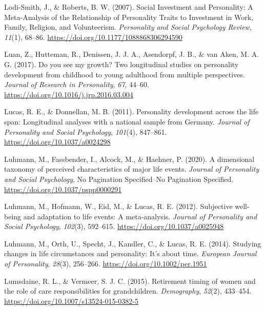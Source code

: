 \documentclass[
  english,
  man, noextraspace]{apa7}
\begin{document}
\leavevmode\hypertarget{ref-lodi-smithSocialInvestmentPersonality2007}{}%
Lodi-Smith, J., \& Roberts, B. W. (2007). Social Investment and Personality: A Meta-Analysis of the Relationship of Personality Traits to Investment in Work, Family, Religion, and Volunteerism. \emph{Personality and Social Psychology Review}, \emph{11}(1), 68--86. \url{https://doi.org/10.1177/1088868306294590}

\leavevmode\hypertarget{ref-luanYouSeeMy2017}{}%
Luan, Z., Hutteman, R., Denissen, J. J. A., Asendorpf, J. B., \& van Aken, M. A. G. (2017). Do you see my growth? Two longitudinal studies on personality development from childhood to young adulthood from multiple perspectives. \emph{Journal of Research in Personality}, \emph{67}, 44--60. \url{https://doi.org/10.1016/j.jrp.2016.03.004}

\leavevmode\hypertarget{ref-lucasPersonalityDevelopmentLife2011}{}%
Lucas, R. E., \& Donnellan, M. B. (2011). Personality development across the life span: Longitudinal analyses with a national sample from Germany. \emph{Journal of Personality and Social Psychology}, \emph{101}(4), 847--861. \url{https://doi.org/10.1037/a0024298}

\leavevmode\hypertarget{ref-luhmannDimensionalTaxonomyPerceived2020}{}%
Luhmann, M., Fassbender, I., Alcock, M., \& Haehner, P. (2020). A dimensional taxonomy of perceived characteristics of major life events. \emph{Journal of Personality and Social Psychology}, No Pagination Specified--No Pagination Specified. \url{https://doi.org/10.1037/pspp0000291}

\leavevmode\hypertarget{ref-luhmannSubjectiveWellbeingAdaptation2012}{}%
Luhmann, M., Hofmann, W., Eid, M., \& Lucas, R. E. (2012). Subjective well-being and adaptation to life events: A meta-analysis. \emph{Journal of Personality and Social Psychology}, \emph{102}(3), 592--615. \url{https://doi.org/10.1037/a0025948}

\leavevmode\hypertarget{ref-luhmannStudyingChangesLife2014}{}%
Luhmann, M., Orth, U., Specht, J., Kandler, C., \& Lucas, R. E. (2014). Studying changes in life circumstances and personality: It's about time. \emph{European Journal of Personality}, \emph{28}(3), 256--266. \url{https://doi.org/10.1002/per.1951}

\leavevmode\hypertarget{ref-lumsdaineRetirementTimingWomen2015}{}%
Lumsdaine, R. L., \& Vermeer, S. J. C. (2015). Retirement timing of women and the role of care responsibilities for grandchildren. \emph{Demography}, \emph{52}(2), 433--454. \url{https://doi.org/10.1007/s13524-015-0382-5}
\end{document}
